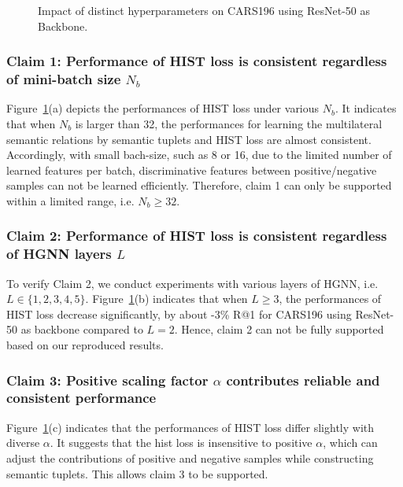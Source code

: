 \begin{figure}[htbp]
    \centering
    \caption{Impact of distinct hyperparameters on CARS196 using ResNet-50 as Backbone.}
   \label{hyperparmeters}
\end{figure}


\subsubsection{Claim 1: Performance of HIST loss is consistent regardless of mini-batch size $N_b$}
Figure~\ref{hyperparmeters}(a) depicts the performances of HIST loss under various $N_b$. It indicates that when $N_b$ is larger than 32, the performances for learning the multilateral semantic relations by semantic tuplets and HIST loss are almost consistent. Accordingly, with small bach-size, such as 8 or 16, due to the limited number of learned features per batch, discriminative features between positive/negative samples can not be learned efficiently. Therefore, claim 1 can only be supported within a limited range, i.e. $N_b \geq 32$.
\subsubsection{Claim 2: Performance of HIST loss is consistent regardless of HGNN layers $L$} To verify Claim 2, we conduct experiments with various layers of HGNN, i.e. $L\in\{1,2,3,4,5\}$. Figure~\ref{hyperparmeters}(b) indicates that when $L\geq 3$, the performances of HIST loss decrease significantly, by about -3\% R@1 for CARS196 using ResNet-50 as backbone compared to $L = 2$. Hence, claim 2 can not be fully supported based on our reproduced results.
\subsubsection{Claim 3: Positive scaling factor $\alpha$ contributes reliable and consistent performance} Figure~\ref{hyperparmeters}(c) indicates that the performances of HIST loss differ slightly with diverse $\alpha$. It suggests that the hist loss is insensitive to positive $\alpha$, which can adjust the contributions of positive and negative samples while constructing semantic tuplets. This allows claim 3 to be supported.
